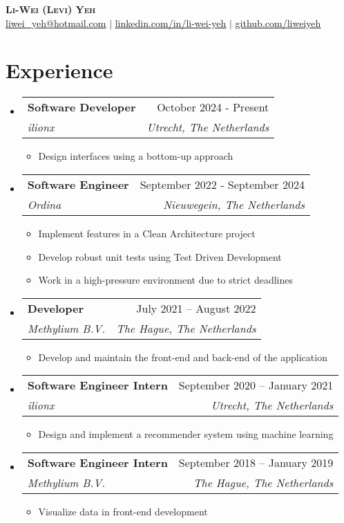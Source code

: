 \documentclass[letterpaper,11pt]{article}
\makeatletter
\newcommand{\resumeItem}[1]{
	\item\small{
		{#1 \vspace{-2pt}}
	}
}
\newcommand{\resumeSubheading}[4]{
	\vspace{4pt}\item
	\begin{tabular*}{0.97\textwidth}[t]{l@{\extracolsep{\fill}}r}
		\textbf{#1} & #2 \\
		\textit{\small#3} & \textit{\small #4} \\
	\end{tabular*}\vspace{-7pt}
}
\newcommand{\resumeSubHeadingListStart}{\begin{itemize}[leftmargin=0.15in, label={}]}
\newcommand{\resumeSubHeadingListEnd}{\end{itemize}}
\newcommand{\resumeItemListStart}{\begin{itemize}}
\newcommand{\resumeItemListEnd}{\end{itemize}\vspace{-5pt}}
\makeatother
\begin{document}
	
	\begin{center}
		\textbf{\Huge \scshape Li-Wei (Levi) Yeh} \\ \vspace{1pt}
		\small \href{mailto:liwei_yeh@hotmail.com}{\underline{liwei\_yeh@hotmail.com}} $|$ 
		\href{https://www.linkedin.com/in/li-wei-yeh/}{\underline{linkedin.com/in/li-wei-yeh}} $|$
		\href{https://github.com/LiWeiYeh/}{\underline{github.com/liweiyeh}}
	\end{center}
	
	
	
	\section{Experience}
	\resumeSubHeadingListStart
	
   	\resumeSubheading
    {Software Developer}{October 2024 - Present}
    {ilionx}{Utrecht, The Netherlands}
    \resumeItemListStart
    \resumeItem{Design interfaces using a bottom-up approach}
    \resumeItemListEnd
    
	\resumeSubheading
	{Software Engineer}{September 2022 - September 2024}
	{Ordina}{Nieuwegein, The Netherlands}
	\resumeItemListStart
    \resumeItem{Implement features in a Clean Architecture project}
    \resumeItem{Develop robust unit tests using Test Driven Development}
   	\resumeItem{Work in a high-pressure environment due to strict deadlines}
	\resumeItemListEnd
	
	\resumeSubheading
	{Developer}{July 2021 – August 2022}
	{Methylium B.V.}{The Hague, The Netherlands}
	\resumeItemListStart
	\resumeItem{Develop and maintain the front-end and back-end of the application}
	\resumeItemListEnd
	
	\resumeSubheading
	{Software Engineer Intern}{September 2020 -- January 2021}
	{ilionx}{Utrecht, The Netherlands}
	\resumeItemListStart
	\resumeItem{Design and implement a recommender system using machine learning}
	\resumeItemListEnd
	
	\resumeSubheading
	{Software Engineer Intern}{September 2018 -- January 2019}
	{Methylium B.V.}{The Hague, The Netherlands}
	\resumeItemListStart
	\resumeItem{Visualize data in front-end development}
	\resumeItemListEnd
	
	\resumeSubHeadingListEnd
	
	
	
\end{document}
